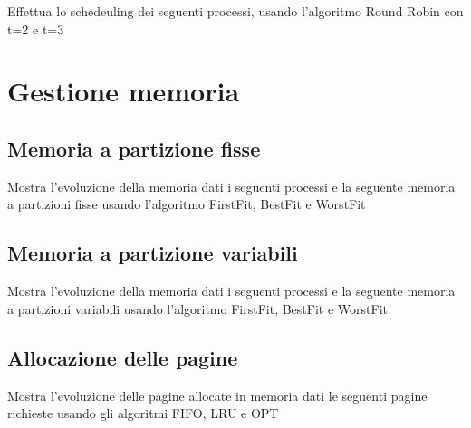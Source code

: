 \documentclass[11pt,fleqn]{book}
\begin{document}
Effettua lo schedeuling dei seguenti processi, usando l'algoritmo Round Robin con t=2 e t=3



\chapter{Gestione memoria}

\section{Memoria a partizione fisse}

Mostra l'evoluzione della memoria dati i seguenti processi e la seguente memoria a partizioni fisse usando l'algoritmo FirstFit, BestFit e WorstFit


\newpage

\section{Memoria a partizione variabili}

Mostra l'evoluzione della memoria dati i seguenti processi e la seguente memoria a partizioni variabili usando l'algoritmo FirstFit, BestFit e WorstFit


\newpage

\section{Allocazione delle pagine}

Mostra l'evoluzione delle pagine allocate in memoria dati le seguenti pagine richieste usando gli algoritmi FIFO, LRU e OPT

\end{document}
